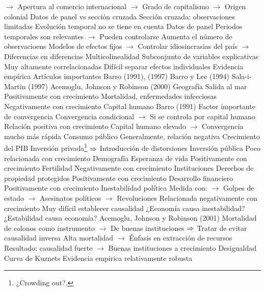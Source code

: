 \documentclass{nuevotema}
\begin{document}
\begin{esquemal}
				\4[] $\to$ Apertura al comercio internacional
				\4[] $\to$ Grado de capitalismo
				\4[] $\to$ Origen colonial
			\3 Datos de panel vs sección cruzada
				\4 Sección cruzada:
				\4[] observaciones limitadas
				\4[] Evolución temporal no se tiene en cuenta
				\4 Datos de panel
				\4[] Periodos temporales son relevantes
				\4[] $\to$ Pueden controlarse
				\4[] Aumenta el número de observacioens
				\4[] Modelos de efectos fijos
				\4[] $\to$ Controlar idiosincrasias del país
				\4[] $\to$ Diferencias en diferencias
			\3 Multicolinealidad
				\4 Subconjunto de variables explicativas
				\4[] Muy altamente correlacionadas
				\4 Difícil separar efectos individuales
		\2 Evidencia empírica
			\3 Artículos importantes
				\4 Barro (1991), (1997)
				\4 Barro y Lee (1994)
				\4 Sala-i-Martin (1997)
				\4 Acemoglu, Johnson y Robinson (2000)
			\3 Geografía
				\4 Salida al mar
				\4[] Positivamente con crecimiento
				\4 Mortalidad, enfermedades infecciosas
				\4[] Negativamente con crecimiento
			\3 Capital humano
				\4 Barro (1991)
				\4 Factor importante de convergencia
				\4[] Convergencia condicional
				\4[] $\to$ Si se controla por capital humano
				\4 Relación positiva con crecimiento
				\4[] Capital humano elevado
				\4[] $\to$ Convergencia mucho más rápida
			\3 Consumo público
				\4 Generalmente, relación negativa
				\4[] Crecimiento del PIB
				\4[] Inversión privada\footnote{¿Crowding out?.}
				\4[] $\Rightarrow$ Introducción de distorsiones
			\3 Inversión pública
				\4 Poco relacionada con crecimiento
			\3 Demografía
				\4 Esperanza de vida
				\4[] Positivamente con crecimiento
				\4 Fertilidad
				\4[] Negativamente con crecimiento
			\3 Instituciones
				\4 Derechos de propiedad protegidos
				\4[] Positivamente con crecimiento
				\4 Desarrollo financiero
				\4[] Positivamente con crecimiento
				\4 Inestabilidad política
				\4[] Medida con:
				\4[] $\to$ Golpes de estado
				\4[] $\to$ Asesinatos políticos
				\4[] $\to$ Revoluciones
				\4[] Relacionada negativamente con crecimiento
				\4[] Muy difícil establecer causalidad
				\4[] ¿Economía causa inestabilidad?
				\4[] ¿Estabilidad causa economía?
				\4 Acemoglu, Johnson y Robinson (2001)
				\4[] Mortalidad de colonos como instrumento
				\4[] $\to$ De buenas instituciones
				\4[] $\Rightarrow$ Tratar de evitar causalidad inversa
				\4[] Alta mortalidad
				\4[] $\to$ Énfasis en extracción de recursos
				\4[] Resultado: causalidad fuerte
				\4[] $\to$ Buenas instituciones a crecimiento
			\3 Desigualdad
				\4 Curva de Kuznets
				\4[] Evidencia empírica relativamente robusta

\end{esquemal}
\end{document}
